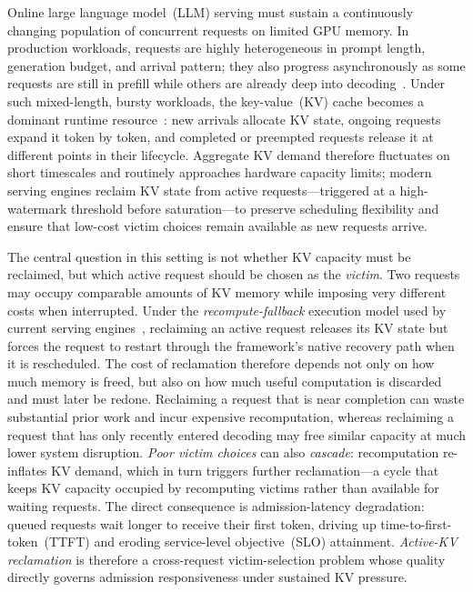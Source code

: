 \documentclass[sigconf,nonacm]{acmart}
\begin{document}
Online large language model~(LLM) serving must sustain a continuously changing
population of concurrent requests on limited GPU memory.  In production
workloads, requests are highly heterogeneous in prompt length, generation
budget, and arrival pattern; they also progress asynchronously as some requests
are still in prefill while others are already deep into
decoding~\cite{Kwon2023, Yu2022, Zheng2024lmsys}.  Under such mixed-length,
bursty workloads, the key-value~(KV) cache becomes a dominant runtime
resource~\cite{Vaswani2017, Pope2022}: new arrivals
allocate KV state, ongoing requests expand it token by token, and completed or
preempted requests release it at different points in their lifecycle.  Aggregate
KV demand therefore fluctuates on short timescales and routinely approaches
hardware capacity limits; modern serving engines reclaim KV state from active
requests---triggered at a high-watermark threshold before saturation---to
preserve scheduling flexibility and ensure that low-cost victim choices remain
available as new requests arrive.

The central question in this setting is not whether KV capacity must be
reclaimed, but which active request should be chosen as the \emph{victim}.
Two requests may occupy comparable amounts of KV memory while imposing very
different costs when interrupted.  Under the \emph{recompute-fallback}
execution model used by current serving engines~\cite{Kwon2023}, reclaiming an
active request releases its KV state but forces the request to restart through
the framework's native recovery path when it is rescheduled.  The cost of reclamation therefore
depends not only on how much memory is freed, but also on how much useful
computation is discarded and must later be redone.  Reclaiming a request that is
near completion can waste substantial prior work and incur expensive
recomputation, whereas reclaiming a request that has only recently entered
decoding may free similar capacity at much lower system disruption.  \emph{Poor victim
choices} can also \emph{cascade}: recomputation re-inflates KV demand, which in turn
triggers further reclamation---a cycle that keeps KV capacity occupied by
recomputing victims rather than available for waiting requests.  The direct
consequence is admission-latency degradation: queued requests wait longer to
receive their first token, driving up time-to-first-token~(TTFT) and eroding
service-level objective~(SLO) attainment.  \emph{Active-KV reclamation} is therefore a
cross-request victim-selection problem whose quality directly governs admission
responsiveness under sustained KV pressure.
\end{document}

